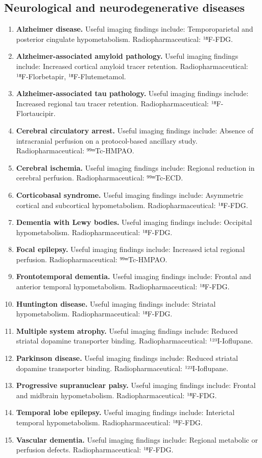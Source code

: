 \subsection{Neurological and neurodegenerative diseases}
\begin{enumerate}[leftmargin=*,itemsep=0.45em,topsep=0.4em]
\item \textbf{Alzheimer disease.} Useful imaging findings include: Temporoparietal and posterior cingulate hypometabolism. Radiopharmaceutical: ¹⁸F-FDG.
\item \textbf{Alzheimer-associated amyloid pathology.} Useful imaging findings include: Increased cortical amyloid tracer retention. Radiopharmaceutical: ¹⁸F-Florbetapir, ¹⁸F-Flutemetamol.
\item \textbf{Alzheimer-associated tau pathology.} Useful imaging findings include: Increased regional tau tracer retention. Radiopharmaceutical: ¹⁸F-Flortaucipir.
\item \textbf{Cerebral circulatory arrest.} Useful imaging findings include: Absence of intracranial perfusion on a protocol-based ancillary study. Radiopharmaceutical: ⁹⁹ᵐTc-HMPAO.
\item \textbf{Cerebral ischemia.} Useful imaging findings include: Regional reduction in cerebral perfusion. Radiopharmaceutical: ⁹⁹ᵐTc-ECD.
\item \textbf{Corticobasal syndrome.} Useful imaging findings include: Asymmetric cortical and subcortical hypometabolism. Radiopharmaceutical: ¹⁸F-FDG.
\item \textbf{Dementia with Lewy bodies.} Useful imaging findings include: Occipital hypometabolism. Radiopharmaceutical: ¹⁸F-FDG.
\item \textbf{Focal epilepsy.} Useful imaging findings include: Increased ictal regional perfusion. Radiopharmaceutical: ⁹⁹ᵐTc-HMPAO.
\item \textbf{Frontotemporal dementia.} Useful imaging findings include: Frontal and anterior temporal hypometabolism. Radiopharmaceutical: ¹⁸F-FDG.
\item \textbf{Huntington disease.} Useful imaging findings include: Striatal hypometabolism. Radiopharmaceutical: ¹⁸F-FDG.
\item \textbf{Multiple system atrophy.} Useful imaging findings include: Reduced striatal dopamine transporter binding. Radiopharmaceutical: ¹²³I-Ioflupane.
\item \textbf{Parkinson disease.} Useful imaging findings include: Reduced striatal dopamine transporter binding. Radiopharmaceutical: ¹²³I-Ioflupane.
\item \textbf{Progressive supranuclear palsy.} Useful imaging findings include: Frontal and midbrain hypometabolism. Radiopharmaceutical: ¹⁸F-FDG.
\item \textbf{Temporal lobe epilepsy.} Useful imaging findings include: Interictal temporal hypometabolism. Radiopharmaceutical: ¹⁸F-FDG.
\item \textbf{Vascular dementia.} Useful imaging findings include: Regional metabolic or perfusion defects. Radiopharmaceutical: ¹⁸F-FDG.
\end{enumerate}
